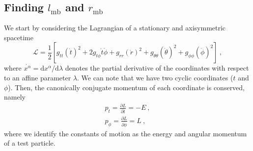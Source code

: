 \documentclass[twocolumn,aps,showpacs,showkeys,prd,superscriptaddress,byrevtex, amsmath]{revtex4-1}
\begin{document}
\begin{appendix}
\section{Finding $l_{\mathrm{mb}}$ and $r_{\mathrm{mb}}$}
\label{ang_mom_appendix}

We start by considering the Lagrangian of a stationary and axisymmetric spacetime
\begin{equation}
\mathcal{L} = \frac{1}{2}\left[g_{tt} (\dot{t})^2 + 2 g_{t\phi} \dot{t}\dot{\phi} + g_{rr} (\dot{r})^2 + g_{\theta\theta} (\dot{\theta})^2 + g_{\phi\phi} (\dot{\phi})^2\right]\ ,
\end{equation}
where $\dot{x^{\alpha}} = \mathrm{d}x^{\alpha}/\mathrm{d}\lambda$ denotes the partial derivative of the coordinates with respect to an affine parameter $\lambda$. We can note that we have two cyclic coordinates ($t$ and $\phi$). Then, the canonically conjugate momentum of each coordinate is conserved, namely
\begin{eqnarray}\label{eq:momenta}
p_t = \frac{\partial L}{\partial \dot{t}} = -E \ ,
\\
p_{\phi} = \frac{\partial L}{\partial \dot{\phi}} = L\ ,
\end{eqnarray}
where we identify the constants of motion as the energy and angular momentum of a test particle.


\end{appendix}
\end{document}
